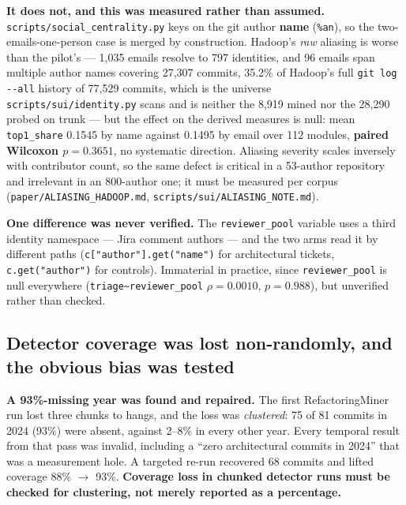 \documentclass[conference]{IEEEtran}
\begin{document}
\textbf{It does not, and this was measured rather than assumed.} \texttt{scripts/\allowbreak{}social\_\allowbreak{}centrality.\allowbreak{}py} keys on the git author \textbf{name} (\texttt{\%an}), so the two-emails-one-person case is merged by construction. Hadoop's \emph{raw} aliasing is worse than the pilot's --- 1,035 emails resolve to 797 identities, and 96 emails span multiple author names covering 27,307 commits, 35.2\% of Hadoop's full \texttt{git log -\allowbreak{}-\allowbreak{}all} history of 77,529 commits, which is the universe \texttt{scripts/\allowbreak{}sui/\allowbreak{}identity.\allowbreak{}py} scans and is neither the 8,919 mined nor the 28,290 probed on trunk --- but the effect on the derived measures is null: mean \texttt{top1\_\allowbreak{}share} 0.1545 by name against 0.1495 by email over 112 modules, \textbf{paired Wilcoxon $p=0.3651$}, no systematic direction. Aliasing severity scales inversely with contributor count, so the same defect is critical in a 53-author repository and irrelevant in an 800-author one; it must be measured per corpus (\texttt{paper/\allowbreak{}ALIASING\_\allowbreak{}HADOOP.\allowbreak{}md}, \texttt{scripts/\allowbreak{}sui/\allowbreak{}ALIASING\_\allowbreak{}NOTE.\allowbreak{}md}).

\textbf{One difference was never verified.} The \texttt{reviewer\_\allowbreak{}pool} variable uses a third identity namespace --- Jira comment authors --- and the two arms read it by different paths (\texttt{c["author"].\allowbreak{}get("name")} for architectural tickets, \texttt{c.\allowbreak{}get("author")} for controls). Immaterial in practice, since \texttt{reviewer\_\allowbreak{}pool} is null everywhere (\texttt{triage\textasciitilde{}reviewer\_\allowbreak{}pool} $\rho = 0.0010$, $p = 0.988$), but unverified rather than checked.

\subsection{Detector coverage was lost non-randomly, and the obvious bias was tested}
\label{sec:6.4}

\textbf{A 93\%-missing year was found and repaired.} The first RefactoringMiner run lost three chunks to hangs, and the loss was \emph{clustered}: 75 of 81 commits in 2024 (93\%) were absent, against 2--8\% in every other year. Every temporal result from that pass was invalid, including a ``zero architectural commits in 2024'' that was a measurement hole. A targeted re-run recovered 68 commits and lifted coverage 88\% $\rightarrow$ 93\%. \textbf{Coverage loss in chunked detector runs must be checked for clustering, not merely reported as a percentage.}
\end{document}

